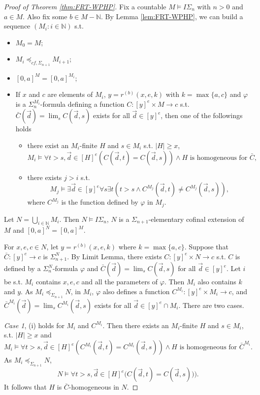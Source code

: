 \documentclass[10pt,a4paper]{amsart}
\begin{document}
\begin{proof}[Proof of Theorem \ref{thm:FRT-WPHP}]
Fix a countable $M \models I\Sigma_n$ with $n > 0$ and $a \in M$.
Also fix some $b \in M - \mathbb{N}$.
By Lemma \ref{lem:FRT-WPHP}, we can build a sequence $(M_i: i \in \mathbb{N})$ s.t.
\begin{itemize}
 \item $M_0 = M$;
 \item $M_i \preceq_{cf,\Sigma_{n+1}} M_{i+1}$;
 \item $[0,a]^M = [0,a]^{M_i}$;
 \item If $x$ and $c$ are elements of $M_i$, 
 $y = r^{(b)}(x,e,k)$ with $k = \max\{a,c\}$ and
 $\varphi$ is a $\Sigma_n^{M_i}$-formula defining a function $C: [y]^e \times M \to c$ 
 s.t. $\bar{C}(\vec{d}) = \lim_s C(\vec{d},s)$ exists for all $\vec{d} \in [y]^e$,
 then one of the followings holds
 \begin{itemize}
  \item[(i)] there exist an $M_i$-finite $H$ and $s \in M_i$ s.t. $|H| \geq x$,
  \[
    M_i \models \forall t > s,\vec{d} \in [H]^e (C(\vec{d},t) = C(\vec{d},s)) \wedge H \text{ is homogeneous for } \bar{C},
  \]
  \item[(ii)] there exists $j > i$ s.t.
  \[
    M_j \models \exists \vec{d} \in [y]^e \forall s \exists t (t > s \wedge C^{M_j}(\vec{d},t) \neq C^{M_j}(\vec{d},s)),
  \]
  where $C^{M_j}$ is the function defined by $\varphi$ in $M_j$.
 \end{itemize}
\end{itemize}
Let $N = \bigcup_{i \in \mathbb{N}} M_i$.
Then $N \models I\Sigma_n$, $N$ is a $\Sigma_{n+1}$-elementary cofinal extension of $M$ and $[0,a]^N = [0,a]^M$.

For $x,e,c \in N$, let $y = r^{(b)}(x,e,k)$ where $k = \max\{a,c\}$.
Suppose that $\bar{C}: [y]^e \to c$ is $\Sigma_{n+1}^N$.
By Limit Lemma, there exists $C: [y]^e \times N \to c$
 s.t. $C$ is defined by a $\Sigma_n^N$-formula $\varphi$ and $\bar{C}(\vec{d}) = \lim_s C(\vec{d},s)$ for all $\vec{d} \in [y]^e$.
Let $i$ be s.t. $M_i$ contains $x,e,c$ and all the parameters of $\varphi$.
Then $M_i$ also contains $k$ and $y$.
As $M_i \preceq_{\Sigma_{n+1}} N$, in $M_i$, $\varphi$ also defines a function $C^{M_i}: [y]^e \times M_i \to c$,
and $\bar{C}^{M_i}(\vec{d}) = \lim_s C^{M_i}(\vec{d},s)$ exists for all $\vec{d} \in [y]^e \cap M_i$.
There are two cases.

\emph{Case 1}, (i) holds for $M_i$ and $C^{M_i}$.
Then there exists an $M_i$-finite $H$ and $s \in M_i$, s.t. $|H| \geq x$ and
\[
  M_i \models \forall t > s,\vec{d} \in [H]^e (C^{M_i}(\vec{d},t) = C^{M_i}(\vec{d},s)) \wedge H \text{ is homogeneous for } \bar{C}^{M_i}.
\]
As $M_i \preceq_{\Sigma_{n+1}} N$,
\[
  N \models \forall t > s,\vec{d} \in [H]^e \big( C(\vec{d},t) = C(\vec{d},s)) \big).
\]
It follows that $H$ is $\bar{C}$-homogeneous in $N$.


\end{proof}
\end{document}
